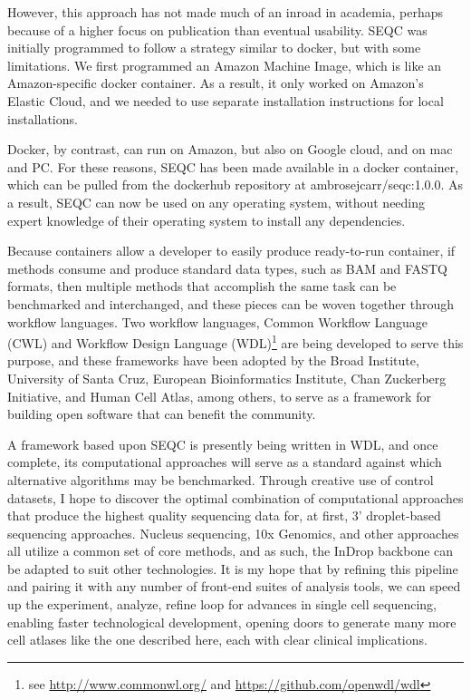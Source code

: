 However, this approach has not made much of an inroad in academia, perhaps because of a higher focus on publication than eventual usability. 
SEQC was initially programmed to follow a strategy similar to docker, but with some limitations.
We first programmed an Amazon Machine Image, which is like an Amazon-specific docker container. 
As a result, it only worked on Amazon's Elastic Cloud, and we needed to use separate installation instructions for local installations. 

Docker, by contrast, can run on Amazon, but also on Google cloud, and on mac and PC.
For these reasons, SEQC has been made available in a docker container, which can be pulled from the dockerhub repository at ambrosejcarr/seqc:1.0.0.
As a result, SEQC can now be used on any operating system, without needing expert knowledge of their operating system to install any dependencies. 

Because containers allow a developer to easily produce ready-to-run container, if methods consume and produce standard data types, such as BAM and FASTQ formats, then multiple methods that accomplish the same task can be benchmarked and interchanged, and these pieces can be woven together through workflow languages. 
Two workflow languages, Common Workflow Language (CWL) and Workflow Design Language (WDL)\footnote{see \url{http://www.commonwl.org/} and \url{https://github.com/openwdl/wdl}} are being developed to serve this purpose, and these frameworks have been adopted by the Broad Institute, University of Santa Cruz, European Bioinformatics Institute, Chan Zuckerberg Initiative, and Human Cell Atlas, among others, to serve as a framework for building open software that can benefit the community. 

A framework based upon SEQC is presently being written in WDL, and once complete, its computational approaches will serve as a standard against which alternative algorithms may be benchmarked.
Through creative use of control datasets, I hope to discover the optimal combination of computational approaches that produce the highest quality sequencing data for, at first, 3' droplet-based sequencing approaches. 
Nucleus sequencing, 10x Genomics, and other approaches all utilize a common set of core methods, and as such, the InDrop backbone can be adapted to suit other technologies. 
It is my hope that by refining this pipeline and pairing it with any number of front-end suites of analysis tools, we can speed up the experiment, analyze, refine loop for advances in single cell sequencing, enabling faster technological development, opening doors to generate many more cell atlases like the one described here, each with clear clinical implications. 
